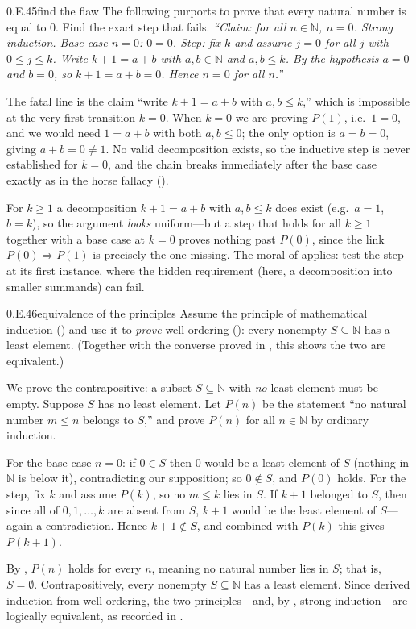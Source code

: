 \documentclass[main.tex]{subfiles}
\begin{document}
\begin{Exercise}{0.E.45}{find the flaw}
The following purports to prove that every natural number is equal to $0$. Find the exact step that
fails. \emph{``Claim: for all $n\in\mathbb N$, $n=0$. Strong induction. Base case $n=0$: $0=0$. Step:
fix $k$ and assume $j=0$ for all $j$ with $0\le j\le k$. Write $k+1=a+b$ with $a,b\in\mathbb N$ and
$a,b\le k$. By the hypothesis $a=0$ and $b=0$, so $k+1=a+b=0$. Hence $n=0$ for all $n$.''}
\end{Exercise}
\begin{Solution}
The fatal line is the claim ``write $k+1=a+b$ with $a,b\le k$,'' which is impossible at the very first
transition $k=0$. When $k=0$ we are proving $P(1)$, i.e.\ $1=0$, and we would need $1=a+b$ with both
$a,b\le 0$; the only option is $a=b=0$, giving $a+b=0\ne 1$. No valid decomposition exists, so the
inductive step is never established for $k=0$, and the chain breaks immediately after the base case
exactly as in the horse fallacy ().

For $k\ge 1$ a decomposition $k+1=a+b$ with $a,b\le k$ does exist (e.g.\ $a=1$, $b=k$), so the argument
\emph{looks} uniform---but a step that holds for all $k\ge 1$ together with a base case at $k=0$ proves
nothing past $P(0)$, since the link $P(0)\Rightarrow P(1)$ is precisely the one missing. The moral of
 applies: test the step at its first instance, where the hidden requirement (here, a
decomposition into smaller summands) can fail.
\end{Solution}

\begin{Exercise}{0.E.46}{equivalence of the principles}
Assume the principle of mathematical induction () and use it to \emph{prove}
well-ordering (): every nonempty $S\subseteq\mathbb N$ has a least element. (Together with
the converse proved in , this shows the two are equivalent.)
\end{Exercise}
\begin{Solution}
We prove the contrapositive: a subset $S\subseteq\mathbb N$ with \emph{no} least element must be
empty. Suppose $S$ has no least element. Let $P(n)$ be the statement ``no natural number $m\le n$
belongs to $S$,'' and prove $P(n)$ for all $n\in\mathbb N$ by ordinary induction.

For the base case $n=0$: if $0\in S$ then $0$ would be a least element of $S$ (nothing in $\mathbb N$
is below it), contradicting our supposition; so $0\notin S$, and $P(0)$ holds. For the step, fix $k$
and assume $P(k)$, so no $m\le k$ lies in $S$. If $k+1$ belonged to $S$, then since all of
$0,1,\dots,k$ are absent from $S$, $k+1$ would be the least element of $S$---again a contradiction.
Hence $k+1\notin S$, and combined with $P(k)$ this gives $P(k+1)$.

By , $P(n)$ holds for every $n$, meaning no natural number lies in $S$; that is,
$S=\emptyset$. Contrapositively, every nonempty $S\subseteq\mathbb N$ has a least element. Since
 derived induction from well-ordering, the two principles---and, by , strong
induction---are logically equivalent, as recorded in .
\end{Solution}

\ifSubfilesClassLoaded{\clearpage\objindex}{}
\end{document}
